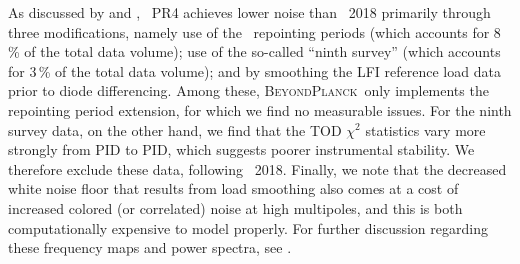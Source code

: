 \documentclass[onecolumn]{aa}
\newcommand{\BP}{\textsc{BeyondPlanck}}
\begin{document}
As discussed by \citet{planck2020-LVII} and \citet{bp10}, \Planck\ PR4
achieves lower noise than \Planck\ 2018 primarily through three
modifications, namely use of the \Planck\ repointing periods (which
accounts for 8\,\% of the total data volume); use of the so-called
``ninth survey'' (which accounts for 3\,\% of the total data volume);
and by smoothing the LFI reference load data prior to diode
differencing. Among these, \BP\ only implements the repointing period
extension, for which we find no measurable issues. For the ninth
survey data, on the other hand, we find that the TOD $\chi^2$
statistics vary more strongly from PID to PID, which suggests poorer
instrumental stability. We therefore exclude these data, following
\Planck\ 2018. Finally, we note that the decreased white noise floor
that results from load smoothing also comes at a cost of increased
colored (or correlated) noise at high multipoles, and this is both
computationally expensive to model properly. For further discussion
regarding these frequency maps and power spectra, see \citet{bp10}.
\end{document}
